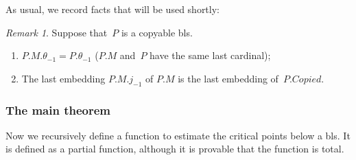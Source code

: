 \documentclass{article}
\newtheorem{lemma}{Lemma}[section]
\theoremstyle{definition}
\theoremstyle{remark}
\newtheorem{remark}[lemma]{Remark}
\begin{document}
As usual, we record facts that will be used shortly:

\begin{remark} \label{rmk:last_embedding_of_P.M}
  Suppose that~$P$ is a copyable bls. 
  \begin{enumerate}
    \item  $P.M.\theta_{-1} = P.\theta_{-1}$ ($P.M$ and~$P$ have the same last cardinal);
    \item  The last embedding $P.M.{j_{-1}}$ of $P.M$ is the last embedding of~$P.Copied$. 
  \end{enumerate}
\end{remark}













\subsubsection*{The main theorem}


Now we recursively define a function to estimate the critical points below a bls. It is defined as a partial function, although it is provable that the function is total.
\end{document}
